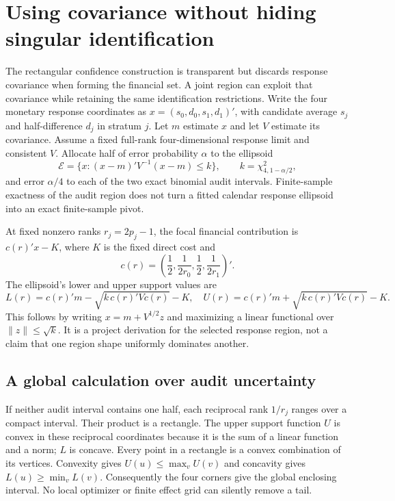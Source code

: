 \section{Using covariance without hiding singular identification}
\label{c7:joint-projection}
The rectangular confidence construction is transparent but discards response
covariance when forming the financial set. A joint region can exploit that
covariance while retaining the same identification restrictions. Write the
four monetary response coordinates as
$x=(s_0,d_0,s_1,d_1)'$, with candidate average $s_j$ and half-difference $d_j$
in stratum $j$. Let $m$ estimate $x$ and let $V$ estimate its covariance.
Assume a fixed full-rank four-dimensional response limit and consistent $V$.
Allocate half of error probability $\alpha$ to the ellipsoid
\[
 \mathcal E=\{x:(x-m)'V^{-1}(x-m)\le
                    k\},\qquad k=\chi^2_{4,1-\alpha/2},
\]
and error $\alpha/4$ to each of the two exact binomial audit intervals.
Finite-sample exactness of the audit region does not turn a fitted calendar
response ellipsoid into an exact finite-sample pivot.

At fixed nonzero ranks $r_j=2p_j-1$, the focal financial contribution is
$c(r)'x-K$, where $K$ is the fixed direct cost and
\[
 c(r)=\left(\frac12,\frac1{2r_0},\frac12,\frac1{2r_1}\right)' .
\]
The ellipsoid's lower and upper support values are
\begin{equation}
 L(r)=c(r)'m-\sqrt{k\,c(r)'Vc(r)}-K,
 \quad U(r)=c(r)'m+\sqrt{k\,c(r)'Vc(r)}-K.
 \label{c7:ellipsoid-support}
\end{equation}
This follows by writing $x=m+V^{1/2}z$ and maximizing a linear functional
over $\|z\|\le\sqrt{k}$. It is a project derivation for the selected
response region, not a claim that one region shape uniformly dominates another.

\subsection{A global calculation over audit uncertainty}
If neither audit interval contains one half, each reciprocal rank $1/r_j$
ranges over a compact interval. Their product is a rectangle. The upper
support function $U$ is convex in these reciprocal coordinates because it is
the sum of a linear function and a norm; $L$ is concave. Every point in a
rectangle is a convex combination of its vertices. Convexity gives
$U(u)\le\max_v U(v)$ and concavity gives $L(u)\ge\min_v L(v)$.
Consequently the four corners give the global enclosing interval. No local
optimizer or finite effect grid can silently remove a tail.

